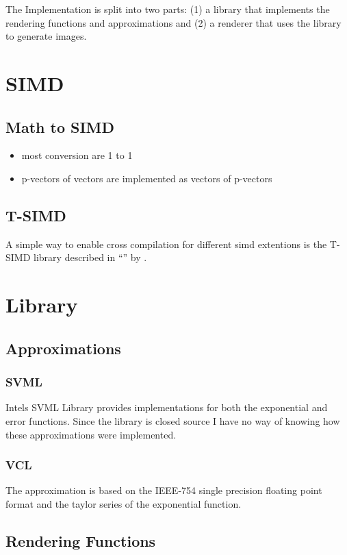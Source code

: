 \documentclass[a4paper, 11pt]{memoir}
\begin{document}
    The Implementation is split into two parts: (1) a library that implements the rendering functions and approximations and (2) a renderer that uses the library to generate images.

    \section{SIMD}
    \subsection{Math to SIMD}
    \begin{itemize}
        \item most conversion are 1 to 1
        \item p-vectors of vectors are implemented as vectors of p-vectors
    \end{itemize}
    \subsection{T-SIMD}
    A simple way to enable cross compilation for different \gls{simd} extentions is the T-SIMD library described in \enquote{} \cite{own_moeller_16_2} by \citeauthor{own_moeller_16_2}.

    \section{Library}
    \subsection{Approximations}
    \subsubsection{SVML}
    Intels SVML Library provides implementations for both the exponential and error functions. Since the library is closed source I have no way of knowing how these approximations were implemented.
    \subsubsection{VCL}
    The approximation is based on the IEEE-754 single precision floating point format and the taylor series of the exponential function.
    \subsection{Rendering Functions}
\end{document}
